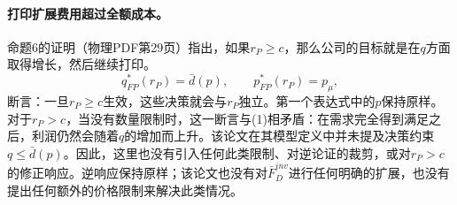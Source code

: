 \documentclass{article}
\begin{document}
\paragraph{打印扩展费用超过全额成本。}
命题6的证明（物理PDF第29页）指出，如果$r_P\geq c$，那么公司的目标就是在$q$方面取得增长，然后继续打印。
\[
q_{FP}^{*}(r_P)=\bar d(p),\qquad
p_{FP}^{*}(r_P)=p_\mu,
\]
断言：一旦$r_P\geq c$生效，这些决策就会与$r_P$独立。第一个表达式中的$p$保持原样。对于$r_P>c$，当没有数量限制时，这一断言与(1)相矛盾：在需求完全得到满足之后，利润仍然会随着$q$的增加而上升。该论文在其模型定义中并未提及决策约束$q\leq\bar d(p)$。因此，这里也没有引入任何此类限制、对逆论证的裁剪，或对$r_P>c$的修正响应。逆响应保持原样；该论文也没有对$\bar F_D^{inv}$进行任何明确的扩展，也没有提出任何额外的价格限制来解决此类情况。
\end{document}
